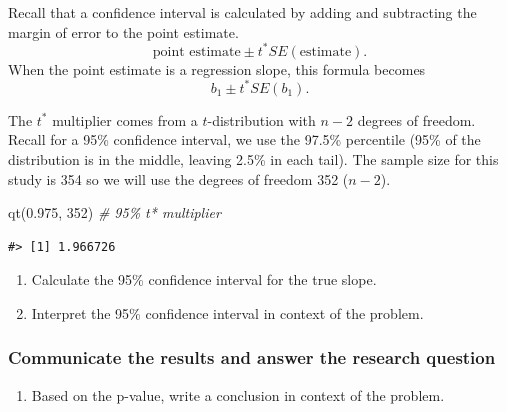 \documentclass[
]{report}
\newenvironment{Shaded}{\begin{snugshade}}{\end{snugshade}}
\newcommand{\CommentTok}[1]{\textcolor[rgb]{0.56,0.35,0.01}{\textit{#1}}}
\newcommand{\DecValTok}[1]{\textcolor[rgb]{0.00,0.00,0.81}{#1}}
\newcommand{\FloatTok}[1]{\textcolor[rgb]{0.00,0.00,0.81}{#1}}
\newcommand{\FunctionTok}[1]{\textcolor[rgb]{0.00,0.00,0.00}{#1}}
\newcommand{\NormalTok}[1]{#1}
\providecommand{\tightlist}{%
  \setlength{\itemsep}{0pt}\setlength{\parskip}{0pt}}
\begin{document}
Recall that a confidence interval is calculated by adding and subtracting the margin of error to the point estimate.\\
\[\mbox{point estimate}\pm t^*SE(\mbox{estimate}).\]
When the point estimate is a regression slope, this formula becomes
\[b_1 \pm t^* SE(b_1).\]

The \(t^*\) multiplier comes from a \(t\)-distribution with \(n-2\) degrees of freedom. Recall for a 95\% confidence interval, we use the 97.5\% percentile (95\% of the distribution is in the middle, leaving 2.5\% in each tail). The sample size for this study is 354 so we will use the degrees of freedom 352 (\(n-2\)).

\begin{Shaded}
\begin{Highlighting}[]
\FunctionTok{qt}\NormalTok{(}\FloatTok{0.975}\NormalTok{, }\DecValTok{352}\NormalTok{) }\CommentTok{\# 95\% t* multiplier }
\end{Highlighting}
\end{Shaded}

\begin{verbatim}
#> [1] 1.966726
\end{verbatim}

\begin{enumerate}
\def\labelenumi{\arabic{enumi}.}
\setcounter{enumi}{10}
\item
  Calculate the 95\% confidence interval for the true slope.
  \vspace{0.8in}
\item
  Interpret the 95\% confidence interval in context of the problem.
\end{enumerate}

\vspace{.8in}

\hypertarget{communicate-the-results-and-answer-the-research-question-5}{%
\subsubsection*{Communicate the results and answer the research question}\label{communicate-the-results-and-answer-the-research-question-5}}

\begin{enumerate}
\def\labelenumi{\arabic{enumi}.}
\setcounter{enumi}{12}
\tightlist
\item
  Based on the p-value, write a conclusion in context of the problem.
\end{enumerate}
\end{document}
